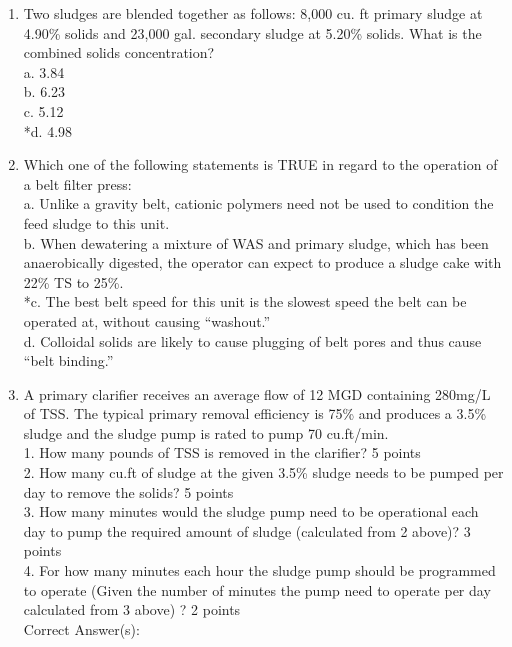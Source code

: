 \documentclass{article}
\begin{document}
\begin{enumerate}
\item  Two sludges are blended together as follows: 8,000 cu. ft primary sludge at 4.90\% solids and 23,000 gal. secondary sludge at 5.20\% solids. What is the combined solids concentration?\\


a. 3.84 \\
b. 6.23 \\
c. 5.12 \\
*d. 4.98 \\

\item  Which one of the following statements is TRUE in regard to the operation of a belt filter press: \\

a. Unlike a gravity belt, cationic polymers need not be used to condition the feed sludge to this unit. \\
b. When dewatering a mixture of WAS and primary sludge, which has been anaerobically digested, the operator can expect to produce a sludge cake with 22\% TS to 25\%. \\
*c. The best belt speed for this unit is the slowest speed the belt can be operated at, without causing “washout.” \\
d. Colloidal solids are likely to cause plugging of belt pores and thus cause “belt binding.” \\

\item  A primary clarifier receives an average flow of 12 MGD containing 280mg/L of TSS.  The typical primary removal efficiency is 75\% and produces a 3.5\% sludge and the sludge pump is rated to pump 70 cu.ft/min.\\
1.  How many pounds of TSS is removed in the clarifier?  5 points\\
2. How many cu.ft of sludge at the given 3.5\% sludge needs to be pumped per day to remove the solids?  5 points\\
3. How many minutes would the sludge pump need to be operational each day to pump the required amount of sludge (calculated from 2 above)? 3 points\\
4.  For how many minutes each hour the sludge pump should be programmed to operate (Given the number of minutes the pump need to operate per day calculated from 3 above) ?  2 points  \\

Correct Answer(s): \\


\end{enumerate}
\end{document}

